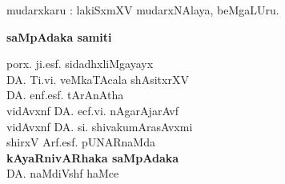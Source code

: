 \medskip

\noindent
mudarxkaru : lakiSxmXV mudarxNAlaya, beMgaLUru.

\newpage

\thispagestyle{empty}

\phantom{a}

\vfill

\begin{center}
{\Large\bf saMpAdaka samiti}

\bigskip
\medskip

{\fontsize{14pt}{16pt}\selectfont
porx. ji.esf. sidadhxliMgayayx\\[8pt]
DA. Ti.vi. veMkaTAcala shAsitxrXV\\[8pt]
DA. enf.esf. tArAnAtha\\[8pt]
vidAvxnf DA. ecf.vi. nAgarAjarAvf\\[8pt]
vidAvxnf DA. si. shivakumArasAvxmi\\[8pt]
shirxV Arf.esf. pUNARnaMda\\[15pt]
{\bf kAyaRnivARhaka saMpAdaka}\\[8pt]
DA. naMdiVshf haMce }\relax
\end{center}

\vfill

\phantom{a}







